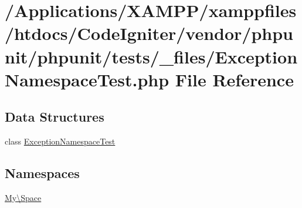 \hypertarget{_exception_namespace_test_8php}{}\section{/\+Applications/\+X\+A\+M\+P\+P/xamppfiles/htdocs/\+Code\+Igniter/vendor/phpunit/phpunit/tests/\+\_\+files/\+Exception\+Namespace\+Test.php File Reference}
\label{_exception_namespace_test_8php}
\subsection*{Data Structures}
\begin{DoxyCompactItemize}
\item 
class \mbox{\hyperlink{class_my_1_1_space_1_1_exception_namespace_test}{Exception\+Namespace\+Test}}
\end{DoxyCompactItemize}
\subsection*{Namespaces}
\begin{DoxyCompactItemize}
\item 
 \mbox{\hyperlink{namespace_my_1_1_space}{My\textbackslash{}\+Space}}
\end{DoxyCompactItemize}
